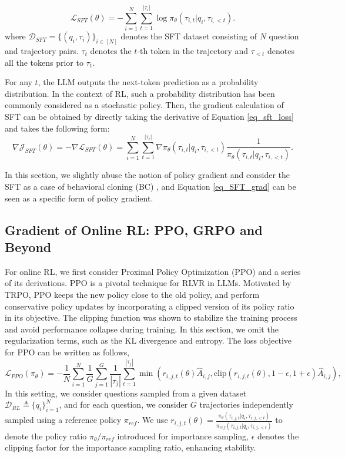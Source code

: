 \documentclass{article} %
\newcommand{\0}{\mathbb{0}}
\newcommand{\1}{\mathbb{1}}
\newcommand{\Dc}{\mathcal{D}}
\newcommand{\cL}{\mathcal{L}}
\begin{document}
\begin{equation}\label{eq_sft_loss}
    \mathcal{L}_{SFT}(\theta) = - \sum_{i=1}^{N} \sum_{t = 1}^{|\tau_{i}|}\log \pi_{\theta} (\tau_{i,t} |q_i, \tau_{i, <t} ).
\end{equation}
where $\mathcal{D}_{SFT} = \{(q_i, \tau_i)\}_{i \in [N]}$ denotes the SFT dataset consisting of $N$ question and trajectory pairs. $\tau_t$ denotes the $t$-th token in the trajectory and $\tau_{<t}$ denotes all the tokens prior to $\tau_t$.

For any $t$, the LLM outputs the next-token prediction as a probability distribution. In the context of RL, such a probability distribution has been commonly considered as a stochastic policy. 
Then, the gradient calculation of SFT can be obtained by directly taking the derivative of Equation \eqref{eq_sft_loss} and takes the following form:
\begin{equation}\label{eq_SFT_grad}
    \nabla \mathcal{J}_{SFT}(\theta) = -\nabla \mathcal{L}_{SFT}(\theta) = 
     \sum_{i=1}^{N} \sum_{t = 1}^{|\tau_{i}|}
    \nabla \pi_\theta (\tau_{i,t} |q_i, \tau_{i, <t} ) \frac{1}{\pi_\theta (\tau_{i,t} |q_i, \tau_{i, <t} )}.
\end{equation}

In this section, we slightly abuse the notion of policy gradient and consider the SFT as a case of behavioral cloning (BC) \citep{torabi2018behavioral}, and Equation \eqref{eq_SFT_grad} can be seen as a specific form of policy gradient.

\subsection{Gradient of Online RL: PPO, GRPO and Beyond}
For online RL, we first consider Proximal Policy Optimization (PPO) \citep{schulman2017proximal} and a series of its derivations. PPO is a pivotal technique for RLVR in LLMs. Motivated by TRPO, PPO keeps the new policy close to the old policy, and perform conservative policy updates by incorporating a clipped version of its policy ratio in its objective. The clipping function was shown to stabilize the training process and avoid performance collapse during training. In this section, we omit the regularization terms, such as the KL divergence and entropy. The loss objective for PPO can be written as follows,
\begin{equation}\label{eq_PPO_loss}
    \cL_{PPO}(\pi_\theta) = 
    - \frac{1}{N}\sum_{i=1}^N \frac{1}{G}\sum_{j=1}^G \frac{1}{|\tau_j|} \sum_{t=1}^{|\tau_j|} 
        \min (r_{i,j,t}(\theta) \hat{A}_{i,j}, \text{clip}(r_{i,j,t}(\theta), 1-\epsilon, 1+\epsilon)  \hat{A}_{i,j}),
\end{equation}
In this setting, we consider questions sampled from a given dataset $\Dc_{RL} \triangleq \{q_i\}_{i=1}^N$, and for each question, we consider $G$ trajectories independently sampled using a reference policy $\pi_{ref}$.
We use $r_{i,j,t}(\theta) = \frac{\pi_\theta (\tau_{i,j,t} |q_i, \tau_{i,j, <t} ) }{\pi_{ref} (\tau_{i,j,t} |q_i, \tau_{i,j, <t} )}$ to denote the policy ratio $\pi_\theta / \pi_{ref}$ introduced for importance sampling, $\epsilon$ denotes the clipping factor for the importance sampling ratio, enhancing stability.
\end{document}
